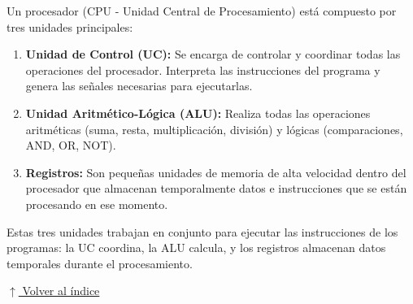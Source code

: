 \documentclass[12pt]{article}
\newcommand{\volverindice}{%
    \vspace{1em}%
    \begin{flushright}%
        \hyperlink{indice}{\small $\uparrow$ Volver al índice}%
    \end{flushright}%
}
\begin{document}
Un procesador (CPU - Unidad Central de Procesamiento) está compuesto por tres unidades principales:

\begin{enumerate}
    \item \textbf{Unidad de Control (UC):} Se encarga de controlar y coordinar todas las operaciones del procesador. Interpreta las instrucciones del programa y genera las señales necesarias para ejecutarlas.
    
    \item \textbf{Unidad Aritmético-Lógica (ALU):} Realiza todas las operaciones aritméticas (suma, resta, multiplicación, división) y lógicas (comparaciones, AND, OR, NOT).
    
    \item \textbf{Registros:} Son pequeñas unidades de memoria de alta velocidad dentro del procesador que almacenan temporalmente datos e instrucciones que se están procesando en ese momento.
\end{enumerate}

Estas tres unidades trabajan en conjunto para ejecutar las instrucciones de los programas: la UC coordina, la ALU calcula, y los registros almacenan datos temporales durante el procesamiento.

\volverindice
\end{document}
